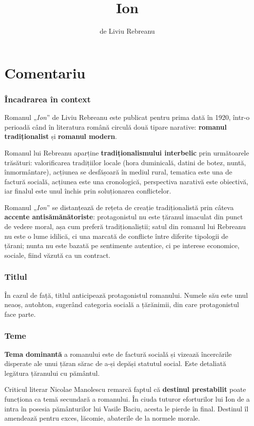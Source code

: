 \documentclass{article}
\title{Ion}
\author{de Liviu Rebreanu}
\date{}
\newcommand{\qu}[1]{„\emph{#1}”}
\begin{document}
\maketitle

\part*{Comentariu}
\section{Încadrarea în context}
Romanul \qu{Ion} de Liviu Rebreanu este publicat pentru prima dată în 1920, într-o perioadă când în literatura română circulă două tipare narative: \textbf{romanul tradiționalist} și \textbf{romanul modern}.

Romanul lui Rebreanu aparține \textbf{tradiționalismului interbelic} prin următoarele trăsături: valorificarea tradițiilor locale (hora duminicală, datini de botez, nuntă, înmormântare), acțiunea se desfășoară în mediul rural, tematica este una de factură socială, acțiunea este una cronologică, perspectiva narativă este obiectivă, iar finalul este unul închis prin soluționarea conflictelor.

Romanul \qu{Ion} se distanțează de rețeta de creație tradiționalistă prin câteva \textbf{accente antisămănătoriste}: protagonistul nu este țăranul imaculat din punct de vedere moral, așa cum preferă tradiționaliștii; satul din romanul lui Rebreanu nu este o lume idilică, ci una marcată de conflicte între diferite tipologii de țărani; nunta nu este bazată pe sentimente autentice, ci pe interese economice, sociale, fiind văzută ca un contract.
\section{Titlul}
În cazul de față, titlul anticipează protagonistul romanului. Numele său este unul neaoș, autohton, sugerând categoria socială a țărănimii, din care protagonistul face parte.
\section{Teme}
\textbf{Tema dominantă} a romanului este de factură socială și vizează încercările disperate ale unui țăran sărac de a-și depăși statutul social. Este detaliată legătura țăranului cu pământul.

Criticul literar Nicolae Manolescu remarcă faptul că \textbf{destinul prestabilit} poate funcționa ca temă secundară a romanului. În ciuda tuturor eforturilor lui Ion de a intra în posesia pământurilor lui Vasile Baciu, acesta le pierde în final. Destinul îl amendează pentru exces, lăcomie, abaterile de la normele morale.
\end{document}
